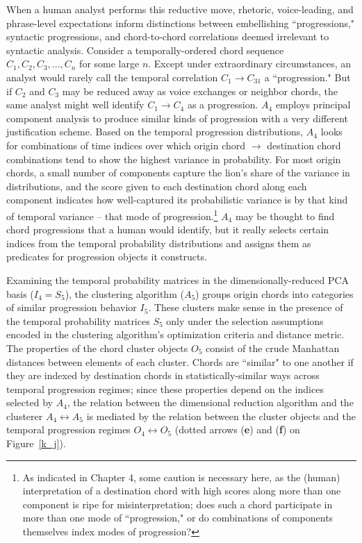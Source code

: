 When a human analyst performs this reductive move, rhetoric, voice-leading, and phrase-level expectations inform distinctions between embellishing ``progressions," syntactic progressions, and chord-to-chord correlations deemed irrelevant to syntactic analysis.  Consider a temporally-ordered chord sequence $C_1, C_2, C_3,...,C_n$ for some large $n$.  Except under extraordinary circumstances, an analyst would rarely call the temporal correlation $C_1 \rightarrow C_{31}$ a ``progression."  But if $C_2$ and $C_3$ may be reduced away as voice exchanges or neighbor chords, the same analyst might well identify $C_1 \rightarrow C_4$ as a progression.  $A_4$ employs principal component analysis to produce similar kinds of progression with a very different justification scheme.  Based on the temporal progression distributions, $A_4$ looks for combinations of time indices over which origin chord $\rightarrow$ destination chord combinations tend to show the highest variance in probability.  For most origin chords, a small number of components capture the lion's share of the variance in distributions, and the score given to each destination chord along each component indicates how well-captured its probabilistic variance is by that kind of temporal variance -- that mode of progression.\footnote{As indicated in Chapter 4, some caution is necessary here, as the (human) interpretation of a destination chord with high scores along more than one component is ripe for misinterpretation; does such a chord participate in more than one mode of ``progression," or do combinations of components themselves index modes of progression?}  $A_4$ may be thought to find chord progressions that a human would identify, but it really selects certain indices from the temporal probability distributions and assigns them as predicates for progression objects it constructs.

Examining the temporal probability matrices in the dimensionally-reduced PCA basis ($I_4 = S_5$), the clustering algorithm ($A_5$) groups origin chords into categories of similar progression behavior $I_5$.  These clusters make sense in the presence of the temporal probability matrices $S_5$ only under the selection assumptions encoded in the clustering algorithm's optimization criteria and distance metric.  The properties of the chord cluster objects $O_5$ consist of the crude Manhattan distances between elements of each cluster.  Chords are ``similar" to one another if they are indexed by destination chords in statistically-similar ways across temporal progression regimes; since these properties depend on the indices selected by $A_4$, the relation between the dimensional reduction algorithm and the clusterer $A_4 \leftrightarrow A_5$ is mediated by the relation between the cluster objects and the temporal progression regimes $O_4 \leftrightarrow O_5$ (dotted arrows (\textbf{e}) and (\textbf{f}) on Figure~\ref{k_j}).

